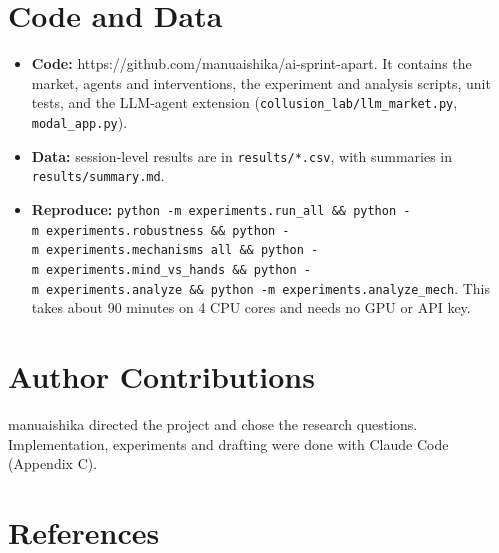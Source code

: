 \documentclass[11pt,a4paper]{article}
\providecommand{\tightlist}{\setlength{\itemsep}{1pt}\setlength{\parskip}{0pt}}
\begin{document}
\hypertarget{code-and-data}{%
\section*{Code and Data}\label{code-and-data}}

\begin{itemize}
\tightlist
\item
  \textbf{Code:} https://github.com/manuaishika/ai-sprint-apart. It contains the market, agents and interventions, the experiment and analysis scripts, unit tests, and the LLM-agent extension (\texttt{collusion\_lab/llm\_market.py}, \texttt{modal\_app.py}).
\item
  \textbf{Data:} session-level results are in \texttt{results/*.csv}, with summaries in \texttt{results/summary.md}.
\item
  \textbf{Reproduce:} \texttt{python\ -m\ experiments.run\_all\ \&\&\ python\ -m\ experiments.robustness\ \&\&\ python\ -m\ experiments.mechanisms\ all\ \&\&\ python\ -m\ experiments.mind\_vs\_hands\ \&\&\ python\ -m\ experiments.analyze\ \&\&\ python\ -m\ experiments.analyze\_mech}. This takes about 90 minutes on 4 CPU cores and needs no GPU or API key.
\end{itemize}

\hypertarget{author-contributions}{%
\section*{Author Contributions}\label{author-contributions}}

manuaishika directed the project and chose the research questions. Implementation, experiments and drafting were done with Claude Code (Appendix C).

\hypertarget{references}{%
\section*{References}\label{references}}
\end{document}
